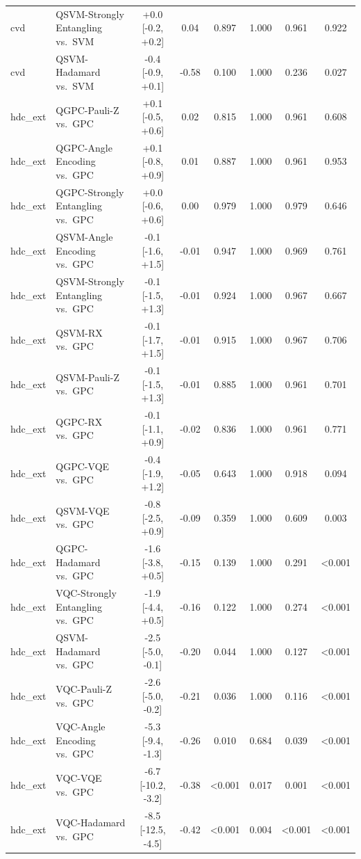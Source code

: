\begin{tabular}{llcccccc}
cvd & QSVM-Strongly Entangling vs.\ SVM & +0.0 [-0.2, +0.2] & 0.04 & 0.897 & 1.000 & 0.961 & 0.922 \\
cvd & QSVM-Hadamard vs.\ SVM & -0.4 [-0.9, +0.1] & -0.58 & 0.100 & 1.000 & 0.236 & 0.027 \\
hdc_ext & QGPC-Pauli-Z vs.\ GPC & +0.1 [-0.5, +0.6] & 0.02 & 0.815 & 1.000 & 0.961 & 0.608 \\
hdc_ext & QGPC-Angle Encoding vs.\ GPC & +0.1 [-0.8, +0.9] & 0.01 & 0.887 & 1.000 & 0.961 & 0.953 \\
hdc_ext & QGPC-Strongly Entangling vs.\ GPC & +0.0 [-0.6, +0.6] & 0.00 & 0.979 & 1.000 & 0.979 & 0.646 \\
hdc_ext & QSVM-Angle Encoding vs.\ GPC & -0.1 [-1.6, +1.5] & -0.01 & 0.947 & 1.000 & 0.969 & 0.761 \\
hdc_ext & QSVM-Strongly Entangling vs.\ GPC & -0.1 [-1.5, +1.3] & -0.01 & 0.924 & 1.000 & 0.967 & 0.667 \\
hdc_ext & QSVM-RX vs.\ GPC & -0.1 [-1.7, +1.5] & -0.01 & 0.915 & 1.000 & 0.967 & 0.706 \\
hdc_ext & QSVM-Pauli-Z vs.\ GPC & -0.1 [-1.5, +1.3] & -0.01 & 0.885 & 1.000 & 0.961 & 0.701 \\
hdc_ext & QGPC-RX vs.\ GPC & -0.1 [-1.1, +0.9] & -0.02 & 0.836 & 1.000 & 0.961 & 0.771 \\
hdc_ext & QGPC-VQE vs.\ GPC & -0.4 [-1.9, +1.2] & -0.05 & 0.643 & 1.000 & 0.918 & 0.094 \\
hdc_ext & QSVM-VQE vs.\ GPC & -0.8 [-2.5, +0.9] & -0.09 & 0.359 & 1.000 & 0.609 & 0.003 \\
hdc_ext & QGPC-Hadamard vs.\ GPC & -1.6 [-3.8, +0.5] & -0.15 & 0.139 & 1.000 & 0.291 & <0.001 \\
hdc_ext & VQC-Strongly Entangling vs.\ GPC & -1.9 [-4.4, +0.5] & -0.16 & 0.122 & 1.000 & 0.274 & <0.001 \\
hdc_ext & QSVM-Hadamard vs.\ GPC & -2.5 [-5.0, -0.1] & -0.20 & 0.044 & 1.000 & 0.127 & <0.001 \\
hdc_ext & VQC-Pauli-Z vs.\ GPC & -2.6 [-5.0, -0.2] & -0.21 & 0.036 & 1.000 & 0.116 & <0.001 \\
hdc_ext & VQC-Angle Encoding vs.\ GPC & -5.3 [-9.4, -1.3] & -0.26 & 0.010 & 0.684 & 0.039 & <0.001 \\
hdc_ext & VQC-VQE vs.\ GPC & -6.7 [-10.2, -3.2] & -0.38 & <0.001 & 0.017 & 0.001 & <0.001 \\
hdc_ext & VQC-Hadamard vs.\ GPC & -8.5 [-12.5, -4.5] & -0.42 & <0.001 & 0.004 & <0.001 & <0.001 \\

\end{tabular}
